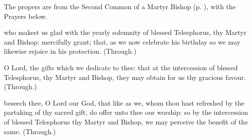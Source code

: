 \begin{rubric}
	The propers are from the Second Common of a Martyr Bishop (p. \pageref{CommonMartyrBishopII}), with the Prayers below.
\end{rubric}

\collect\label{TelesphorusCollect}
 who makest us glad with the yearly solemnity of blessed Telesphorus, thy Martyr and Bishop: mercifully grant; that, as we now celebrate his birthday so we may likewise rejoice in his protection. (Through.)

\secret\label{TelesphorusSecret}
 O Lord, the gifts which we dedicate to thee: that at the intercession of blessed Telesphorus, thy Martyr and Bishop, they may obtain for us thy gracious favour. (Through.)

\postcommunion\label{TelesphorusPostcommunion}
 beseech thee, O Lord our God, that like as we, whom thou hast refreshed by the partaking of thy sacred gift, do offer unto thee our worship: so by the intercession of blessed Telesphorus thy Martyr and Bishop, we may perceive the benefit of the same. (Through.)\\


